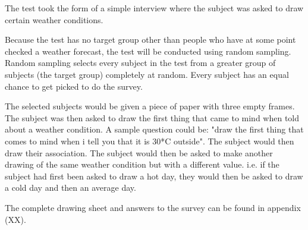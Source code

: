 The test took the form of a simple interview where the subject was asked to draw certain weather conditions.


Because the test has no target group other than people who have at some point checked a weather forecast, the test will be conducted using random sampling.
Random sampling selects every subject in the test from a greater group of subjects (the target group) completely at random. 
Every subject has an equal chance to get picked to do the survey.


The selected subjects would be given a piece of paper with three empty frames. 
The subject was then asked to draw the first thing that came to mind when told about a weather condition. 
A sample question could be: "draw the first thing that comes to mind when i tell you that it is 30*C outside". 
The subject would then draw their association. 
The subject would then be asked to make another drawing of the same weather condition but with a different value. 
i.e. if the subject had first been asked to draw a hot day, they would then be asked to draw a cold day and then an average day.


The complete drawing sheet and answers to the survey can be found in appendix (XX).

